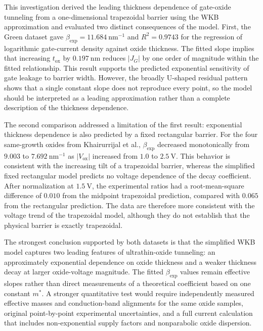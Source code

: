 \documentclass[12pt]{article}
\begin{document}
This investigation derived the leading thickness dependence of gate-oxide tunneling from a one-dimensional trapezoidal barrier using the WKB approximation and evaluated two distinct consequences of the model. First, the Green dataset gave \(\beta_{\mathrm{exp}}=11.684~\mathrm{nm^{-1}}\) and \(R^2=0.9743\) for the regression of logarithmic gate-current density against oxide thickness. The fitted slope implies that increasing \(t_{\mathrm{ox}}\) by \(0.197~\mathrm{nm}\) reduces \(\lvert J_G\rvert\) by one order of magnitude within the fitted relationship. This result supports the predicted exponential sensitivity of gate leakage to barrier width. However, the broadly U-shaped residual pattern shows that a single constant slope does not reproduce every point, so the model should be interpreted as a leading approximation rather than a complete description of the thickness dependence.

The second comparison addressed a limitation of the first result: exponential thickness dependence is also predicted by a fixed rectangular barrier. For the four same-growth oxides from Khairurrijal et al., \(\beta_{\mathrm{exp}}\) decreased monotonically from \(9.003\) to \(7.692~\mathrm{nm^{-1}}\) as \(\lvert V_{\mathrm{ox}}\rvert\) increased from \(1.0\) to \(2.5~\mathrm{V}\). This behavior is consistent with the increasing tilt of a trapezoidal barrier, whereas the simplified fixed rectangular model predicts no voltage dependence of the decay coefficient. After normalization at \(1.5~\mathrm{V}\), the experimental ratios had a root-mean-square difference of \(0.010\) from the midpoint trapezoidal prediction, compared with \(0.065\) from the rectangular prediction. The data are therefore more consistent with the voltage trend of the trapezoidal model, although they do not establish that the physical barrier is exactly trapezoidal.

The strongest conclusion supported by both datasets is that the simplified WKB model captures two leading features of ultrathin-oxide tunneling: an approximately exponential dependence on oxide thickness and a weaker thickness decay at larger oxide-voltage magnitude. The fitted \(\beta_{\mathrm{exp}}\) values remain effective slopes rather than direct measurements of a theoretical coefficient based on one constant \(m^*\). A stronger quantitative test would require independently measured effective masses and conduction-band alignments for the same oxide samples, original point-by-point experimental uncertainties, and a full current calculation that includes non-exponential supply factors and nonparabolic oxide dispersion.

\newpage
{}

\end{document}
